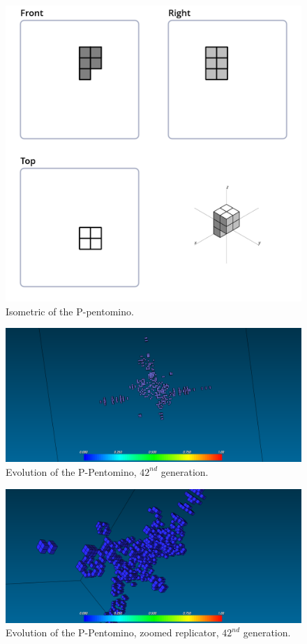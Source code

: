 \begin{figure}
	\centering
	\includegraphics[scale=0.3]{iso_diagrams/p.png}
	\caption{Isometric of the P-pentomino.}
  \label{fig:iso-pent-p}
\end{figure}


\begin{figure}
	\centering
	\includegraphics[scale=0.3]{pentominoes_ss/p_42.png}
	\caption{Evolution of the P-Pentomino, $42^{nd}$ generation.}
  \label{fig:ss-pent:p-42}
\end{figure}

\begin{figure}
	\centering
	\includegraphics[scale=0.3]{pentominoes_ss/p_42_puffer.png}
	\caption{Evolution of the P-Pentomino, zoomed replicator, $42^{nd}$
	generation.}
  \label{fig:ss-pent:p-42-puffer}
\end{figure}

